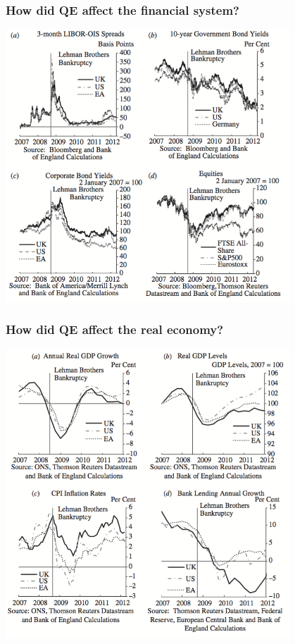 \documentclass[11pt]{beamer}
\begin{document}
\begin{frame}
	\frametitle{How did QE affect the financial system?}
    \begin{center}
	   	\includegraphics[width=0.8\textwidth]{Figures/FinancialConditions.png}
    \end{center}
\end{frame}


\begin{frame}
	\frametitle{How did QE affect the real economy?}
    \begin{center}
	   	\includegraphics[width=0.8\textwidth]{Figures/MacroIndicators.png}
    \end{center}
\end{frame}
\end{document}
